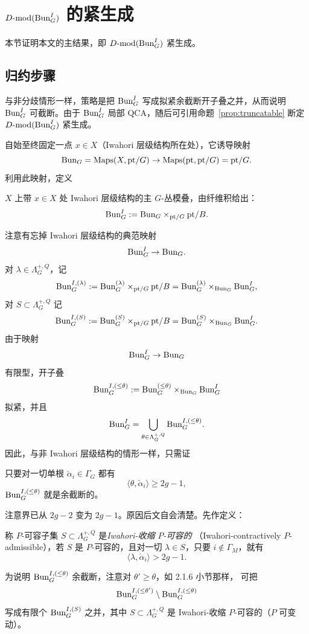 
\section{\texorpdfstring{$D\text{-}\mathrm{mod}(\mathrm{Bun}^I_G)$ 的紧生成}{D-mod(IG) 的紧生成}}
\label{sec:bunI-cg}

本节证明本文的主结果，即 $D\text{-}\mathrm{mod}(\mathrm{Bun}^I_G)$ 紧生成。

\subsection{归约步骤}
\label{sec:reduction}

与非分歧情形一样，策略是把 $\mathrm{Bun}^I_G$ 写成拟紧余截断开子叠之并，从而说明
$\mathrm{Bun}^I_G$ 可截断。由于 $\mathrm{Bun}^I_G$ 局部 QCA，随后可引用命题~\ref{prop:truncatable}
断定 $D\text{-}\mathrm{mod}(\mathrm{Bun}^I_G)$ 紧生成。

自始至终固定一点 $x\in X$（Iwahori 层级结构所在处），它诱导映射
\[
\mathrm{Bun}_G=\operatorname{Maps}(X,\mathrm{pt}/G)\to \operatorname{Maps}(\mathrm{pt},\mathrm{pt}/G)=\mathrm{pt}/G.
\]
利用此映射，定义

\begin{definition}
\label{def:bunI}
$X$ 上带 $x\in X$ 处 Iwahori 层级结构的主 $G$-丛模叠，由纤维积给出：
\[
\mathrm{Bun}^I_G:=\mathrm{Bun}_G\times_{\mathrm{pt}/G}\mathrm{pt}/B.
\]
\end{definition}

注意有忘掉 Iwahori 层级结构的典范映射
\[
\mathrm{Bun}^I_G\to \mathrm{Bun}_G.
\]
对 $\lambda\in \Lambda^{+,Q}_G$，记
\[
\mathrm{Bun}^{I,(\lambda)}_G:=\mathrm{Bun}^{(\lambda)}_G\times_{\mathrm{pt}/G}\mathrm{pt}/B
=\mathrm{Bun}^{(\lambda)}_G\times_{\mathrm{Bun}_G}\mathrm{Bun}^I_G,
\]
对 $S\subset \Lambda^{+,Q}_G$ 记
\[
\mathrm{Bun}^{I,(S)}_G:=\mathrm{Bun}^{(S)}_G\times_{\mathrm{pt}/G}\mathrm{pt}/B
=\mathrm{Bun}^{(S)}_G\times_{\mathrm{Bun}_G}\mathrm{Bun}^I_G .
\]
由于映射
\[
\mathrm{Bun}^I_G\to \mathrm{Bun}_G
\]
有限型，开子叠
\[
\mathrm{Bun}^{I,(\le\theta)}_G:=\mathrm{Bun}^{(\le\theta)}_G\times_{\mathrm{Bun}_G}\mathrm{Bun}^I_G
\]
拟紧，并且
\[
\mathrm{Bun}^I_G=\bigcup_{\theta\in \Lambda^{+,Q}_G}\mathrm{Bun}^{I,(\le\theta)}_G .
\]
因此，与非 Iwahori 层级结构的情形一样，只需证

\begin{proposition}
\label{prop:bunI-cotrunc}
只要对一切单根 $\check\alpha_i\in \Gamma_G$ 都有
\[
\langle\theta,\check\alpha_i\rangle\ge 2g-1,
\]
$\mathrm{Bun}^{I,(\le\theta)}_G$ 就是余截断的。
\end{proposition}

注意界已从 $2g-2$ 变为 $2g-1$。原因后文自会清楚。先作定义：

\begin{definition}
\label{def:iwahori-padmissible}
称 $P$-可容子集 $S\subset \Lambda^{+,Q}_G$ 是\emph{Iwahori-收缩 $P$-可容的}
（Iwahori-contractively $P$-admissible），若 $S$ 是 $P$-可容的，且对一切
$\lambda\in S$，只要 $i\notin \Gamma_M$，就有
\[
\langle\lambda,\check\alpha_i\rangle>2g-1.
\]
\end{definition}
为说明 $\mathrm{Bun}^{I,(\le\theta)}_G$ 余截断，注意对 $\theta'\ge \theta$，如 2.1.6 小节那样，
可把
\[
\mathrm{Bun}^{I,(\le\theta')}_G\setminus \mathrm{Bun}^{I,(\le\theta)}_G
\]
写成有限个 $\mathrm{Bun}^{I,(S)}_G$ 之并，其中 $S\subset\Lambda^{+,Q}_G$ 是 Iwahori-收缩
$P$-可容的（$P$ 可变动）。

